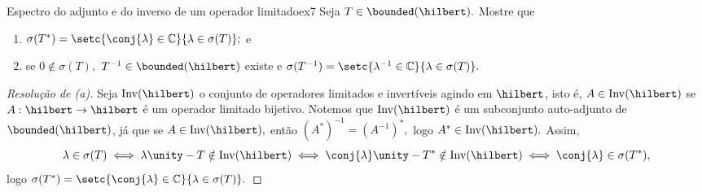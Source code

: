 \begin{exercício}{Espectro do adjunto e do inverso de um operador limitado}{ex7}
  Seja \(T \in \bounded(\hilbert).\) Mostre que
  \begin{enumerate}[label=(\alph*)]
    \item \(\sigma(T^*) = \setc{\conj{\lambda} \in \mathbb{C}}{\lambda \in \sigma(T)};\) e
    \item se \(0 \notin \sigma(T),\) \(T^{-1} \in \bounded(\hilbert)\) existe e \(\sigma(T^{-1}) = \setc{\lambda^{-1} \in \mathbb{C}}{\lambda \in \sigma(T)}.\)
  \end{enumerate}
\end{exercício}
\begin{proof}[Resolução de (a)]
  Seja \(\mathrm{Inv}(\hilbert)\) o conjunto de operadores limitados e invertíveis agindo em \(\hilbert\), isto é, \(A \in \mathrm{Inv}(\hilbert)\) se \(A : \hilbert \to \hilbert\) é um operador limitado bijetivo. Notemos que \(\mathrm{Inv}(\hilbert)\) é um subconjunto auto-adjunto de \(\bounded(\hilbert)\), já que se \(A \in \mathrm{Inv}(\hilbert),\)  então \((A^*)^{-1} = (A^{-1})^*,\) logo \(A^* \in \mathrm{Inv}(\hilbert).\) Assim,
  \begin{equation*}
    \lambda \in \sigma(T) \iff \lambda \unity - T \notin \mathrm{Inv}(\hilbert) \iff \conj{\lambda}\unity - T^* \notin \mathrm{Inv}(\hilbert) \iff \conj{\lambda} \in \sigma(T^*),
  \end{equation*}
  logo \(\sigma(T^*) = \setc{\conj{\lambda} \in \mathbb{C}}{\lambda \in \sigma(T)}.\)
\end{proof}

